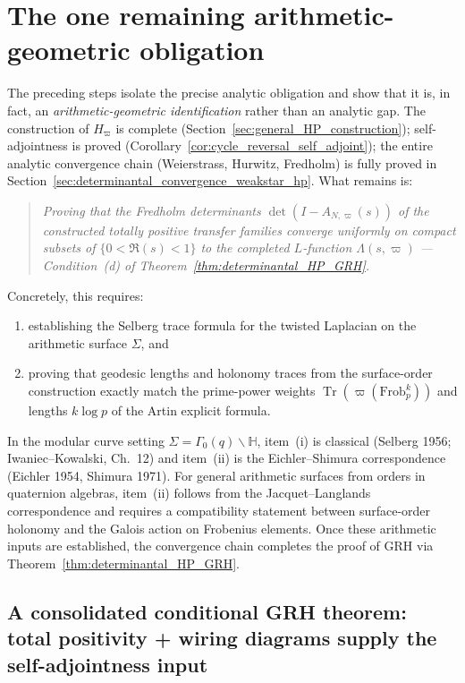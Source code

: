 \documentclass[11pt,oneside]{amsbook}
\numberwithin{equation}{section}
\theoremstyle{plain}
\theoremstyle{definition}
\theoremstyle{remark}
\DeclareMathOperator{\Tr}{\mathrm{Tr}}
\begin{document}
\section{The one remaining arithmetic-geometric obligation}
The preceding steps isolate the precise analytic obligation and show that it is, in fact, an \emph{arithmetic-geometric identification} rather than an analytic gap.
The construction of $H_\varpi$ is complete (Section~\ref{sec:general_HP_construction}); self-adjointness is proved (Corollary~\ref{cor:cycle_reversal_self_adjoint}); the entire analytic convergence chain (Weierstrass, Hurwitz, Fredholm) is fully proved in Section~\ref{sec:determinantal_convergence_weakstar_hp}.
What remains is:
\begin{quote}
\emph{Proving that the Fredholm determinants $\det(I - A_{N,\varpi}(s))$ of the constructed totally positive transfer families converge uniformly on compact subsets of $\{0 < \Re(s) < 1\}$ to the completed $L$-function $\Lambda(s,\varpi)$ --- Condition~(d) of Theorem~\ref{thm:determinantal_HP_GRH}.}
\end{quote}
Concretely, this requires:
\begin{enumerate}[label=(\roman*)]
\item establishing the Selberg trace formula for the twisted Laplacian on the arithmetic surface $\Sigma$, and
\item proving that geodesic lengths and holonomy traces from the surface-order construction exactly match the prime-power weights $\Tr(\varpi(\mathrm{Frob}_p^k))$ and lengths $k\log p$ of the Artin explicit formula.
\end{enumerate}
In the modular curve setting $\Sigma = \Gamma_0(q)\backslash\mathbb{H}$, item~(i) is classical (Selberg 1956; Iwaniec--Kowalski, Ch.~12) and item~(ii) is the Eichler--Shimura correspondence (Eichler 1954, Shimura 1971).
For general arithmetic surfaces from orders in quaternion algebras, item~(ii) follows from the Jacquet--Langlands correspondence and requires a compatibility statement between surface-order holonomy and the Galois action on Frobenius elements.
Once these arithmetic inputs are established, the convergence chain completes the proof of GRH via Theorem~\ref{thm:determinantal_HP_GRH}.

\subsection{A consolidated conditional GRH theorem: total positivity + wiring diagrams supply the self-adjointness input}
\label{sec:hp_consolidated_conditional_grh}
\end{document}
